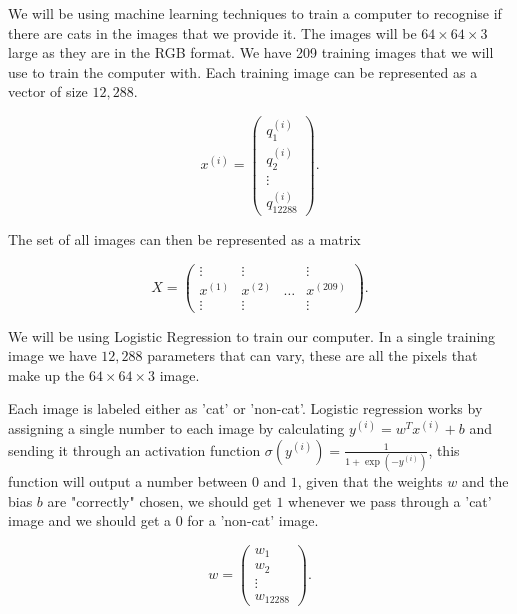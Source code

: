 We will be using machine learning techniques to train a
computer to recognise if there are cats in the images that
we provide it.  The images will be $64 \times 64 \times 3$
large as they are in the RGB format.  We have 209 training
images that we will use to train the computer with.  Each
training image can be represented as a vector of size
$12,288$.

\begin{equation}
    x^{(i)} = 
    \begin{pmatrix}
        q_1^{(i)} \\
        q_2^{(i)} \\
        \vdots \\
        q_{12288}^{(i)}
    \end{pmatrix}.
\end{equation}

The set of all images can then be represented as a matrix

\begin{equation}
    X = 
    \begin{pmatrix}
        \vdots & \vdots & & \vdots \\
        x^{(1)} & x^{(2)} & \dots & x^{(209)} \\
        \vdots & \vdots & & \vdots
    \end{pmatrix}.
\end{equation}

We will be using Logistic Regression to train our computer.
In a single training image we have $12,288$ parameters that
can vary, these are all the pixels that make up the $64
\times 64 \times 3$ image.

Each image is labeled either as 'cat' or 'non-cat'. Logistic
regression works by assigning a single number to each image
by calculating $y^{(i)} = w^T x^{(i)} + b$ and sending it
through an activation function $\sigma(y^{(i)}) = \frac{1}{1
+ \exp(-y^{(i)}) }$, this function will output a number
between $0$ and $1$, given that the weights $w$ and the bias
$b$ are "correctly" chosen, we should get $1$ whenever we
pass through a 'cat' image and we should get a $0$ for a
'non-cat' image. 

\begin{equation}
    w = 
    \begin{pmatrix}
        w_1 \\
        w_2 \\
        \vdots \\
        w_{12288}
    \end{pmatrix}.
\end{equation}  

